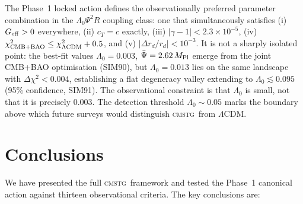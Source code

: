 \documentclass[12pt,a4paper]{article}
\newcommand{\CMSTG}{\textsc{cmstg}}
\newcommand{\Psibar}{\bar\Psi}
\newcommand{\Geff}{G_{\rm eff}}
\newcommand{\Lz}{\Lambda_0}
\newcommand{\Mpl}{M_{\rm Pl}}
\begin{document}
The Phase~1 locked action defines the observationally preferred parameter
combination in the $\Lz\Psi^2 R$ coupling class: one that simultaneously
satisfies (i) $\Geff > 0$ everywhere, (ii) $c_T = c$ exactly,
(iii) $|\gamma-1| < 2.3\times10^{-5}$,
(iv) $\chi^2_{\rm CMB+BAO} \leq \chi^2_{\Lambda\rm CDM} + 0.5$, and
(v) $|\Delta r_d/r_d| < 10^{-3}$. It is not a sharply isolated point: the
best-fit values $\Lz = 0.003$, $\Psibar = 2.62\,\Mpl$ emerge from the joint
CMB+BAO optimisation (SIM90), but $\Lz = 0.013$ lies on the same landscape
with $\Delta\chi^2 < 0.004$, establishing a flat degeneracy valley extending
to $\Lz \lesssim 0.095$ (95\% confidence, SIM91). The observational constraint
is that $\Lz$ is small, not that it is precisely $0.003$. The detection
threshold $\Lz \sim 0.05$ marks the boundary above which future surveys would
distinguish \CMSTG\ from $\Lambda$CDM.

\section{Conclusions}
\label{sec:conclusions}

We have presented the full \CMSTG\ framework and tested the Phase~1 canonical
action against thirteen observational criteria. The key conclusions are:
\end{document}
